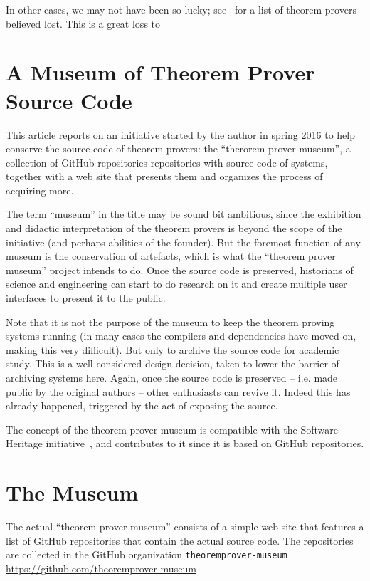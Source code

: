 \documentclass[smallcondensed]{svjour3}
\begin{document}
In other cases, we may not have been so lucky; see~\cite{tpmuseum:tpbl:on} for a list of
theorem provers believed lost. This is a great loss to

\section{A Museum of Theorem Prover Source Code}

This article reports on an initiative started by the author in spring 2016 to help
conserve the source code of theorem provers: the ``therorem prover museum'', a collection
of GitHub repositories repositories with source code of systems, together with a web site
that presents them and organizes the process of acquiring more.

The term ``museum'' in the title may be sound bit ambitious, since the exhibition and
didactic interpretation of the theorem provers is beyond the scope of the initiative (and
perhaps abilities of the founder). But the foremost function of any museum is the
conservation of artefacts, which is what the ``theorem prover museum'' project intends to
do. Once the source code is preserved, historians of science and engineering can start to
do research on it and create multiple user interfaces to present it to the public. 

Note that it is not the purpose of the museum to keep the theorem proving systems running
(in many cases the compilers and dependencies have moved on, making this very
difficult). But only to archive the source code for academic study.  This is a
well-considered design decision, taken to lower the barrier of archiving systems
here. Again, once the source code is preserved -- i.e. made public by the original authors
-- other enthusiasts can revive it. Indeed this has already happened, triggered by the act
of exposing the source.

The concept of the theorem prover museum is compatible with the Software Heritage
initiative~\cite{SoftwareHeritage:on}, and contributes to it since it is based on GitHub
repositories.


\section{The Museum}

The actual ``theorem prover museum'' consists of a simple web site that features a list of
GitHub repositories that contain the actual source code. The repositories are collected in
the GitHub organization \texttt{theoremprover-museum} 
\url{https://github.com/theoremprover-museum}
\end{document}
